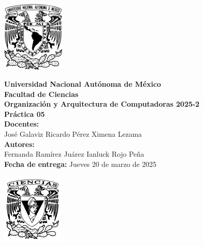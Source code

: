 \documentclass[12pt,letterpaper]{article}
\begin{document}
\begin{center}
\newcommand{\imp}{\rightarrow}
\newcommand{\vp}{\varphi}
  \begin{minipage}{3cm}
    \begin{center}
      \includegraphics[height=3.4cm]{../unam_logo.png}
    \end{center}
  \end{minipage}\hfill
  \begin{minipage}{10cm}
    \begin{center}
      \textbf{\Large Universidad Nacional Autónoma de México}\\[0.2cm]
      \textbf{\large Facultad de Ciencias}\\[0.2cm]
      \textbf{Organización y Arquitectura de Computadoras 2025-2}\\[0.4cm]
      \textbf{\Large Práctica 05}\\[0.1cm]
      \textbf{Docentes:}\\
      José Galaviz \hspace{1em} Ricardo Pérez \hspace{1em} Ximena Lezama\\[0.3cm]
      \textbf{Autores:}\\
      Fernanda Ramírez Juárez \quad Ianluck Rojo Peña\\[0.3cm]
      \textbf{Fecha de entrega:} Jueves 20 de marzo de 2025
    \end{center}
  \end{minipage}\hfill
  \begin{minipage}{3cm}
    \begin{center}
      \includegraphics[height=3.4cm]{../fc_logo.png}
    \end{center}
  \end{minipage}
\end{center}
\end{document}
